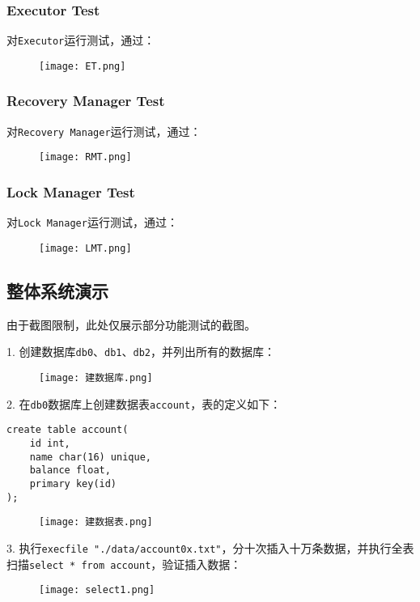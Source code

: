 \documentclass[12pt]{article}
\begin{document}
    \subsubsection{Executor Test}
    对\texttt{Executor}运行测试，通过：
    \begin{figure}[H]
    \centering
    \texttt{[image: ET.png]}
    \end{figure}

    \subsubsection{Recovery Manager Test}
    对\texttt{Recovery Manager}运行测试，通过：
    \begin{figure}[H]
    \centering
    \texttt{[image: RMT.png]}
    \end{figure}

    \subsubsection{Lock Manager Test}
    对\texttt{Lock Manager}运行测试，通过：
    \begin{figure}[H]
    \centering
    \texttt{[image: LMT.png]}
    \end{figure}

    \newpage
    \subsection{整体系统演示}
    由于截图限制，此处仅展示部分功能测试的截图。

    1. 创建数据库\texttt{db0}、\texttt{db1}、\texttt{db2}，并列出所有的数据库：
    \begin{figure}[H]
    \centering
    \texttt{[image: 建数据库.png]}
    \end{figure}

    2. 在\texttt{db0}数据库上创建数据表\texttt{account}，表的定义如下：
\begin{lstlisting}
create table account(
    id int, 
    name char(16) unique, 
    balance float, 
    primary key(id)
);
\end{lstlisting}
    
    \begin{figure}[H]
    \centering
    \texttt{[image: 建数据表.png]}
    \end{figure}

    3. 执行\texttt{execfile "./data/account0x.txt"}，分十次插入十万条数据，并执行全表扫描\texttt{select * from account}，验证插入数据：
    \begin{figure}[H]
    \centering
    \texttt{[image: select1.png]}
    \end{figure}
\end{document}
